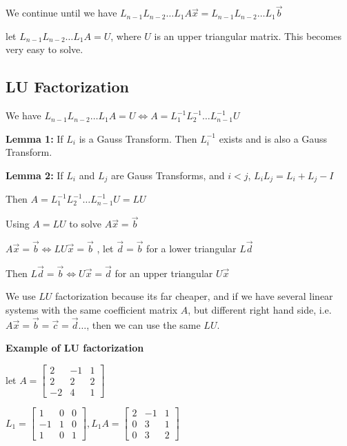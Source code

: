 \documentclass{article}
\begin{document}
We continue until we have $L_{n - 1} L_{n - 2} \dots L_1 A \Vec{x} =  L_{n - 1} L_{n - 2} \dots L_1 \Vec{b}$

let $L_{n - 1} L_{n - 2} \dots L_1 A= U$, where $U$ is an upper triangular matrix. This becomes very easy to solve.

\pagebreak

\text{}

\subsection{LU Factorization}

We have $L_{n - 1} L_{n - 2} \dots L_1 A = U \Leftrightarrow A = L_1^{-1} L_2^{-1} \dots L_{n - 1}^{-1} U$

\textbf{Lemma 1:} If $L_i$ is a Gauss Transform. Then $L_i^{-1}$ exists and is also a Gauss Transform.


\textbf{Lemma 2:} If $L_i$ and $L_j$ are Gauss Transforms, and $i < j$,  $L_i L_j = L_i + L_j - I$

Then $A = L_1^{-1} L_2^{-1} \dots L_{n - 1}^{-1} U = LU$

\vspace{0.2cm}

Using $A = LU$ to solve $A \vec{x} = \vec{b}$

\hspace{3cm} $A\vec{x} = \vec{b} \Leftrightarrow LU \vec{x} = \vec{b}$ , let $\vec{d} = \vec{b}$ for a lower triangular $L\vec{d}$

\hspace{3cm} Then $L\vec{d} = \vec{b} \Leftrightarrow U\vec{x} = \vec{d}$ for an upper triangular $U\vec{x}$

\vspace{0.2cm}

We use $LU$ factorization because its far cheaper, and if we have several linear systems with the same coefficient matrix $A$, but different right hand side, i.e. $A \vec{x} = \vec{b} = \vec{c} = \vec{d} \dots$, then we can use the same $LU$.

\vspace{0.3cm}

\textbf{Example of LU factorization}

let $A = \begin{bmatrix}
2 & -1 & 1\\
2 & 2 & 2\\
-2 & 4 & 1
\end{bmatrix}$

$L_1 = \begin{bmatrix}
1 & 0 & 0\\
-1 & 1 & 0\\
1 & 0 & 1
\end{bmatrix}, L_1 A = \begin{bmatrix}
2 & -1 & 1\\
0 & 3 & 1\\
0 & 3 & 2
\end{bmatrix}$
\end{document}
